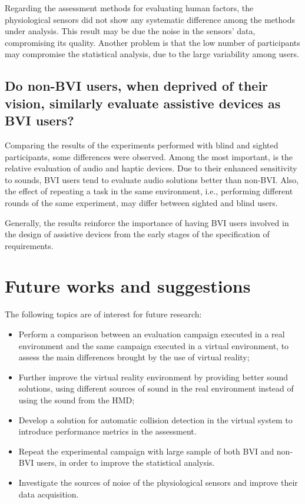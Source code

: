 Regarding the assessment methods for evaluating human factors, the physiological sensors did not show any systematic difference among the methods under analysis. This result may be due the noise in the sensors' data, compromising its quality. Another problem is that the low number of participants may compromise the statistical analysis, due to the large variability among users.

\subsection*{Do non-BVI users, when deprived of their vision, similarly evaluate assistive devices as BVI users?}

Comparing the results of the experiments performed with blind and sighted participants, some differences were observed. Among the most important, is the relative evaluation of audio and haptic devices. Due to their enhanced sensitivity to sounds, BVI users tend to evaluate audio solutions better than non-BVI. Also, the effect of repeating a task in the same environment, i.e., performing different rounds of the same experiment, may differ between sighted and blind users.

Generally, the results reinforce the importance of having BVI users involved in the design of assistive devices from the early stages of the specification of requirements.


\section{Future works and suggestions}

The following topics are of interest for future research:

\begin{itemize}
    \item Perform a comparison between an evaluation campaign executed in a real environment and the same campaign executed in a virtual environment, to assess the main differences brought by the use of virtual reality;
    \item Further improve the virtual reality environment by providing better sound solutions, using different sources of sound in the real environment instead of using the sound from the HMD;
    \item Develop a solution for automatic collision detection in the virtual system to introduce performance metrics in the assessment.
    \item Repeat the experimental campaign with large sample of both BVI and non-BVI users, in order to improve the statistical analysis.
    \item Investigate the sources of noise of the physiological sensors and improve their data acquisition.
\end{itemize}